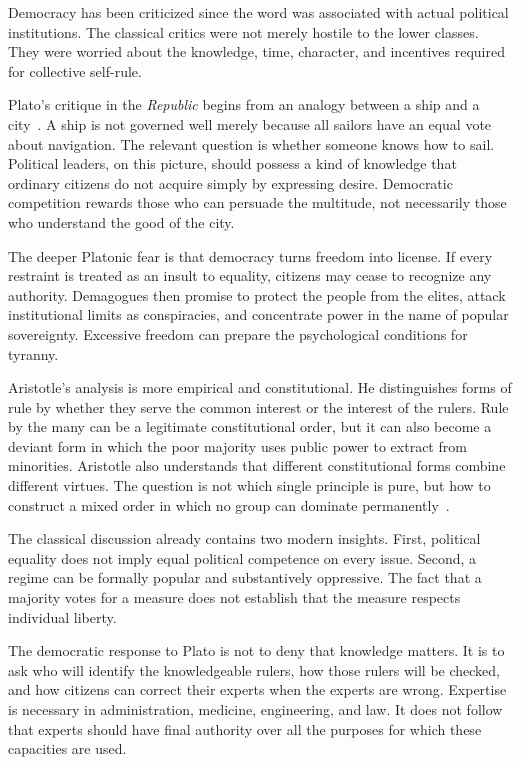 ﻿\documentclass[12pt,a4paper]{book}
\begin{document}
Democracy has been criticized since the word was associated with actual
political institutions.  The classical critics were not merely hostile to
the lower classes.  They were worried about the knowledge, time, character,
and incentives required for collective self-rule.

Plato's critique in the \emph{Republic} begins from an analogy between a
ship and a city~\cite{plato-republic}.  A ship is not governed well merely
because all sailors have an equal vote about navigation.  The relevant
question is whether someone knows how to sail.  Political leaders, on this
picture, should possess a kind of knowledge that ordinary citizens do not
acquire simply by expressing desire.  Democratic competition rewards those
who can persuade the multitude, not necessarily those who understand the
good of the city.

The deeper Platonic fear is that democracy turns freedom into license.  If
every restraint is treated as an insult to equality, citizens may cease to
recognize any authority.  Demagogues then promise to protect the people from
the elites, attack institutional limits as conspiracies, and concentrate
power in the name of popular sovereignty.  Excessive freedom can prepare
the psychological conditions for tyranny.

Aristotle's analysis is more empirical and constitutional.  He distinguishes
forms of rule by whether they serve the common interest or the interest of
the rulers.  Rule by the many can be a legitimate constitutional order, but
it can also become a deviant form in which the poor majority uses public
power to extract from minorities.  Aristotle also understands that different
constitutional forms combine different virtues.  The question is not which
single principle is pure, but how to construct a mixed order in which no
group can dominate permanently~\cite{barnes-aristotle}.

The classical discussion already contains two modern insights.  First,
political equality does not imply equal political competence on every issue.
Second, a regime can be formally popular and substantively oppressive.  The
fact that a majority votes for a measure does not establish that the measure
respects individual liberty.

The democratic response to Plato is not to deny that knowledge matters.  It
is to ask who will identify the knowledgeable rulers, how those rulers will
be checked, and how citizens can correct their experts when the experts are
wrong.  Expertise is necessary in administration, medicine, engineering,
and law.  It does not follow that experts should have final authority over
all the purposes for which these capacities are used.
\end{document}
